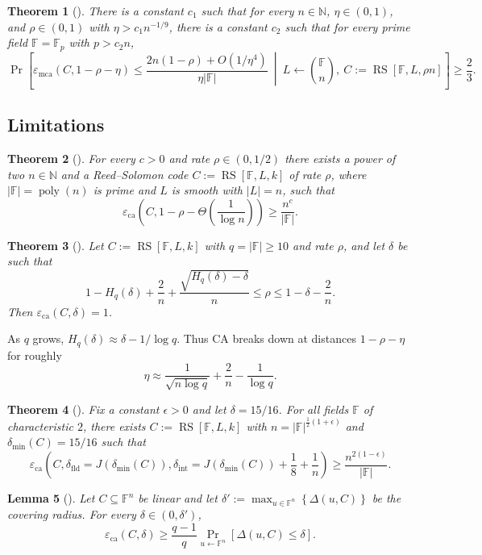 \documentclass[11pt]{article}
\theoremstyle{plain}
\newtheorem{theorem}{Theorem}[section]
\newtheorem{lemma}[theorem]{Lemma}
\theoremstyle{definition}
\newcommand{\F}{\mathbb{F}}
\newcommand{\N}{\mathbb{N}}
\newcommand{\RS}[3]{\operatorname{RS}[#1,#2,#3]}
\newcommand{\epsca}{\varepsilon_{\mathrm{ca}}}
\newcommand{\epsmca}{\varepsilon_{\mathrm{mca}}}
\newcommand{\distmin}{\delta_{\min}}
\newcommand{\fld}{\mathrm{fld}}
\newcommand{\intr}{\mathrm{int}}
\newcommand{\set}[1]{\left\{#1\right\}}
\newcommand{\abs}[1]{\left|#1\right|}
\DeclareMathOperator{\poly}{poly}
\DeclareMathOperator*{\Prb}{Pr}
\begin{document}
\begin{theorem}[\cite{GG25}]
There is a constant $c_1$ such that for every $n\in\N$, $\eta\in(0,1)$, and $\rho\in(0,1)$ with $\eta>c_1n^{-1/9}$, there is a constant $c_2$ such that for every prime field $\F=\F_p$ with $p>c_2n$,
\[
\Prb\left[
\epsmca(C,1-\rho-\eta)\le
\frac{2n(1-\rho)+O(1/\eta^4)}{\eta\abs{\F}}
\ \middle|\
L\leftarrow\binom{\F}{n},\ C:=\RS{\F}{L}{\rho n}
\right]
\ge \frac23.
\]
\end{theorem}

\subsection{Limitations}

\begin{theorem}[\cite{BCHKS25,KK25}]
For every $c>0$ and rate $\rho\in(0,1/2)$ there exists a power of two $n\in\N$ and a Reed--Solomon code $C:=\RS{\F}{L}{k}$ of rate $\rho$, where $\abs{\F}=\poly(n)$ is prime and $L$ is smooth with $\abs{L}=n$, such that
\[
  \epsca\left(C,1-\rho-\Theta\left(\frac1{\log n}\right)\right)
  \ge \frac{n^c}{\abs{\F}}.
\]
\end{theorem}

\begin{theorem}[\cite{CS25}]
Let $C:=\RS{\F}{L}{k}$ with $q=\abs{\F}\ge10$ and rate $\rho$, and let $\delta$ be such that
\[
  1-H_q(\delta)+\frac2n+\frac{\sqrt{H_q(\delta)-\delta}}{n}\le \rho\le 1-\delta-\frac2n.
\]
Then $\epsca(C,\delta)=1$.
\end{theorem}

As $q$ grows, $H_q(\delta)\approx \delta-1/\log q$. Thus CA breaks down at distances $1-\rho-\eta$ for roughly
\[
  \eta\approx \frac{1}{\sqrt{n\log q}}+\frac2n-\frac1{\log q}.
\]

\begin{theorem}[\cite{BCHKS25}]
Fix a constant $\epsilon>0$ and let $\delta=15/16$. For all fields $\F$ of characteristic $2$, there exists $C:=\RS{\F}{L}{k}$ with $n=\abs{\F}^{\frac12(1+\epsilon)}$ and $\distmin(C)=15/16$ such that
\[
  \epsca\left(C,\delta_{\fld}=J(\distmin(C)),\delta_{\intr}=J(\distmin(C))+\frac18+\frac1n\right)
  \ge \frac{n^{2(1-\epsilon)}}{\abs{\F}}.
\]
\end{theorem}

\begin{lemma}[\cite{DG25}]
Let $C\subseteq\F^n$ be linear and let $\delta':=\max_{u\in\F^n}\set{\Delta(u,C)}$ be the covering radius. For every $\delta\in(0,\delta')$,
\[
  \epsca(C,\delta)\ge \frac{q-1}{q}\Prb_{u\leftarrow\F^n}[\Delta(u,C)\le\delta].
\]
\end{lemma}
\end{document}
